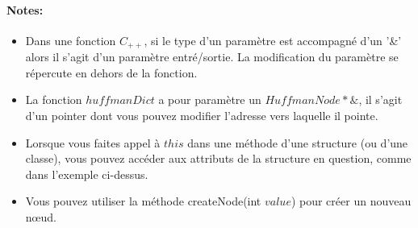 \documentclass[11pt]{extarticle}
\begin{document}
\paragraph{Notes:} 
\begin{itemize}
\item Dans une fonction $C_{++}$, si le type d'un paramètre est accompagné d'un '\&' alors il s'agit d'un paramètre entré/sortie. La modification du paramètre se répercute en dehors de la fonction.
\item La fonction $huffmanDict$ a pour paramètre un $HuffmanNode*\&$, il s'agit d'un pointer dont vous pouvez modifier l'adresse vers laquelle il pointe.
\item Lorsque vous faites appel à $this$ dans une méthode d'une structure (ou d'une classe), vous pouvez accéder aux attributs de la structure en question, comme dans l'exemple ci-dessus.
\item Vous pouvez utiliser la méthode createNode(int $value$) pour créer un nouveau nœud.
\end{itemize}
\end{document}
